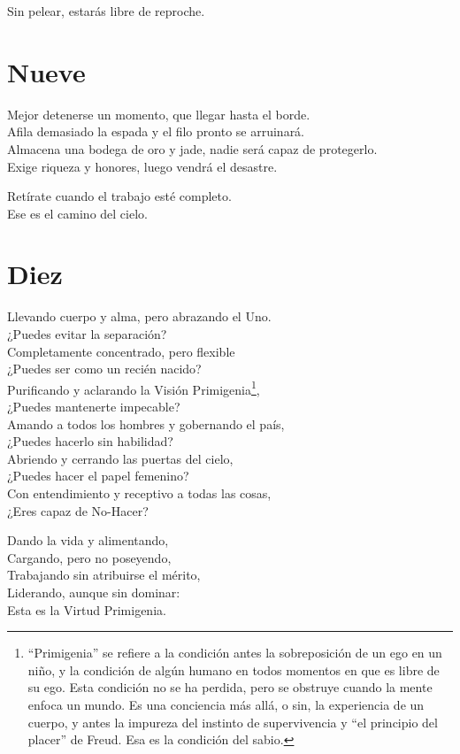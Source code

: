 \documentclass[hidelinks]{memoir}
\begin{document}
	Sin pelear, estarás libre de reproche.
	
	\chapter*{Nueve}
	
	Mejor detenerse un momento, que llegar hasta el borde.\\
	Afila demasiado la espada y el filo pronto se arruinará.\\
	Almacena una bodega de oro y jade, nadie será capaz de protegerlo.\\
	Exige riqueza y honores, luego vendrá el desastre.
	
	Retírate cuando el trabajo esté completo.\\
	Ese es el camino del cielo.
	
	\chapter*{Diez}
	
	Llevando cuerpo y alma, pero abrazando el Uno.\\
	¿Puedes evitar la separación?\\
	Completamente concentrado, pero flexible\\
	¿Puedes ser como un recién nacido?\\
	Purificando y aclarando la Visión Primigenia\footnote{``Primigenia'' se refiere a la condición antes la sobreposición de un
		ego en un niño, y la condición de algún humano en todos momentos en que
		es libre de su ego. Esta condición no se ha perdida, pero se obstruye
		cuando la mente enfoca un mundo. Es una conciencia más allá, o sin, la
		experiencia de un cuerpo, y antes la impureza del instinto de
		supervivencia y ``el principio del placer'' de Freud. Esa es la
		condición del sabio.},\\
	¿Puedes mantenerte impecable?\\
	Amando a todos los hombres y gobernando el país,\\
	¿Puedes hacerlo sin habilidad?\\
	Abriendo y cerrando las puertas del cielo,\\
	¿Puedes hacer el papel femenino?\\
	Con entendimiento y receptivo a todas las cosas,\\
	¿Eres capaz de No-Hacer?
	
	Dando la vida y alimentando,\\
	Cargando, pero no poseyendo,\\
	Trabajando sin atribuirse el mérito,\\
	Liderando, aunque sin dominar:\\
	Esta es la Virtud Primigenia.
	
\end{document}
